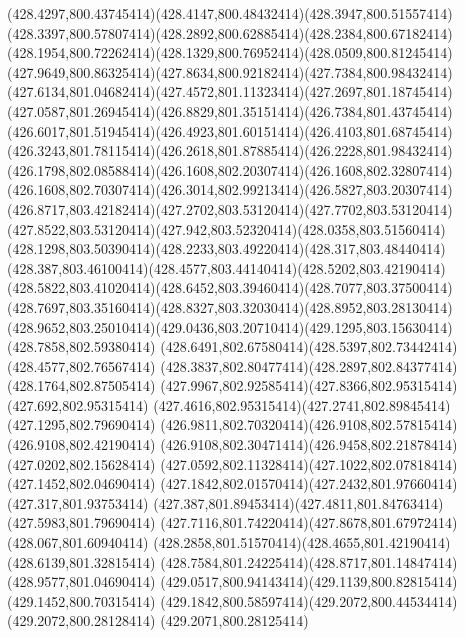 {{	\curveto(428.4297,800.43745414)(428.4147,800.48432414)(428.3947,800.51557414)
	\curveto(428.3397,800.57807414)(428.2892,800.62885414)(428.2384,800.67182414)
	\curveto(428.1954,800.72262414)(428.1329,800.76952414)(428.0509,800.81245414)
	\curveto(427.9649,800.86325414)(427.8634,800.92182414)(427.7384,800.98432414)
	\curveto(427.6134,801.04682414)(427.4572,801.11323414)(427.2697,801.18745414)
	\curveto(427.0587,801.26945414)(426.8829,801.35151414)(426.7384,801.43745414)
	\curveto(426.6017,801.51945414)(426.4923,801.60151414)(426.4103,801.68745414)
	\curveto(426.3243,801.78115414)(426.2618,801.87885414)(426.2228,801.98432414)
	\curveto(426.1798,802.08588414)(426.1608,802.20307414)(426.1608,802.32807414)
	\curveto(426.1608,802.70307414)(426.3014,802.99213414)(426.5827,803.20307414)
	\curveto(426.8717,803.42182414)(427.2702,803.53120414)(427.7702,803.53120414)
	\curveto(427.8522,803.53120414)(427.942,803.52320414)(428.0358,803.51560414)
	\curveto(428.1298,803.50390414)(428.2233,803.49220414)(428.317,803.48440414)
	\curveto(428.387,803.46100414)(428.4577,803.44140414)(428.5202,803.42190414)
	\curveto(428.5822,803.41020414)(428.6452,803.39460414)(428.7077,803.37500414)
	\curveto(428.7697,803.35160414)(428.8327,803.32030414)(428.8952,803.28130414)
	\curveto(428.9652,803.25010414)(429.0436,803.20710414)(429.1295,803.15630414)
	\lineto(428.7858,802.59380414)
	\curveto(428.6491,802.67580414)(428.5397,802.73442414)(428.4577,802.76567414)
	\curveto(428.3837,802.80477414)(428.2897,802.84377414)(428.1764,802.87505414)
	\curveto(427.9967,802.92585414)(427.8366,802.95315414)(427.692,802.95315414)
	\curveto(427.4616,802.95315414)(427.2741,802.89845414)(427.1295,802.79690414)
	\curveto(426.9811,802.70320414)(426.9108,802.57815414)(426.9108,802.42190414)
	\curveto(426.9108,802.30471414)(426.9458,802.21878414)(427.0202,802.15628414)
	\curveto(427.0592,802.11328414)(427.1022,802.07818414)(427.1452,802.04690414)
	\curveto(427.1842,802.01570414)(427.2432,801.97660414)(427.317,801.93753414)
	\curveto(427.387,801.89453414)(427.4811,801.84763414)(427.5983,801.79690414)
	\curveto(427.7116,801.74220414)(427.8678,801.67972414)(428.067,801.60940414)
	\curveto(428.2858,801.51570414)(428.4655,801.42190414)(428.6139,801.32815414)
	\curveto(428.7584,801.24225414)(428.8717,801.14847414)(428.9577,801.04690414)
	\curveto(429.0517,800.94143414)(429.1139,800.82815414)(429.1452,800.70315414)
	\curveto(429.1842,800.58597414)(429.2072,800.44534414)(429.2072,800.28128414)
	\closepath
	\moveto(429.2071,800.28125414)
}
}
{
}
